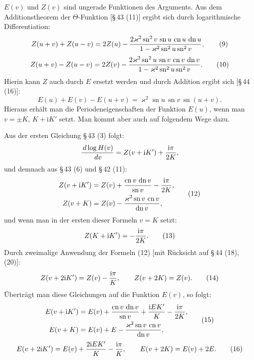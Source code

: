 \documentclass[11pt]{article}
\providecommand{\dd}{\,d}
\providecommand{\sn}{\operatorname{sn}}
\providecommand{\cn}{\operatorname{cn}}
\providecommand{\dn}{\operatorname{dn}}
\providecommand{\ii}{\mathrm{i}}
\begin{document}
$E(v)$ und $Z(v)$ sind ungerade Funktionen des Arguments. Aus dem Additionstheorem der $\Theta$-Funktion [\S\,43 (11)] ergibt sich durch logarithmische Differentiation:
\begin{equation}
Z(u+v)+Z(u-v)=2Z(u)-{2\varkappa^2\sn^2v\,\sn u\,\cn u\,\dn u\over1-\varkappa^2\sn^2u\sn^2v},
\tag{9}
\end{equation}
\begin{equation}
Z(u+v)-Z(u-v)=2Z(v)-{2\varkappa^2\sn^2u\,\sn v\,\cn v\,\dn v\over1-\varkappa^2\sn^2u\sn^2v}.
\tag{10}
\end{equation}
Hierin kann $Z$ auch durch $E$ ersetzt werden und durch Addition ergibt sich [\S\,44 (16)]:
\begin{equation}
E(u)+E(v)-E(u+v)=\varkappa^2\sn u\,\sn v\,\sn(u+v).
\tag{11}
\end{equation}
Hieraus erhält man die Periodeneigenschaften der Funktion $E(u)$, wenn man $v=\pm K$, $K+\ii K'$ setzt. Man kommt aber auch auf folgendem Wege dazu.

Aus der ersten Gleichung \S\,43 (3) folgt:
\[
{\dd\log H(v)\over\dd v}=Z(v+\ii K')+{\ii\pi\over2K},
\]
und demnach aus \S\,43 (6) und \S\,42 (11):
\begin{equation}
\begin{aligned}
Z(v+\ii K')&=Z(v)+{\cn v\,\dn v\over\sn v}-{\ii\pi\over2K},\\
Z(v+K)&=Z(v)-{\varkappa^2\sn v\,\cn v\over\dn v},
\end{aligned}
\tag{12}
\end{equation}
und wenn man in der ersten dieser Formeln $v=K$ setzt:
\begin{equation}
Z(K+\ii K')=-{\ii\pi\over2K}.
\tag{13}
\end{equation}
Durch zweimalige Anwendung der Formeln (12) [mit Rücksicht auf \S\,44 (18), (20)]:
\begin{equation}
Z(v+2\ii K')=Z(v)-{\ii\pi\over K},
\qquad
Z(v+2K)=Z(v).
\tag{14}
\end{equation}
Überträgt man diese Gleichungen auf die Funktion $E(v)$, so folgt:
\begin{equation}
\begin{aligned}
E(v+\ii K')&=E(v)+{\cn v\,\dn v\over\sn v}+{\ii E K'\over K}-{\ii\pi\over2K},\\
E(v+K)&=E(v)+E-{\varkappa^2\sn v\,\cn v\over\dn v},
\end{aligned}
\tag{15}
\end{equation}
\begin{equation}
E(v+2\ii K')=E(v)+{2\ii E K'\over K}-{\ii\pi\over K},
\qquad
E(v+2K)=E(v)+2E.
\tag{16}
\end{equation}
\end{document}
